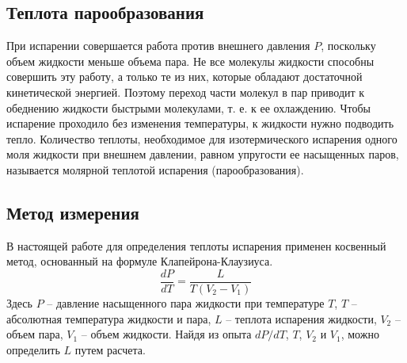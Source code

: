 \documentclass[a4paper,12pt]{article}
\theoremstyle{plain} %
\theoremstyle{definition} %
\theoremstyle{remark} %
\begin{document}
	\subsection{Теплота парообразования}
	При испарении совершается работа против внешнего давления $P$, поскольку объем жидкости меньше объема пара. Не все молекулы жидкости способны совершить эту работу, а только те из них, которые обладают достаточной кинетической энергией. Поэтому переход части молекул в пар приводит к обеднению жидкости быстрыми молекулами, т. е. к ее охлаждению. Чтобы испарение проходило без изменения температуры, к жидкости нужно подводить тепло. Количество теплоты, необходимое для изотермического испарения одного моля жидкости при внешнем давлении, равном упругости ее насыщенных паров, называется молярной теплотой испарения (парообразования).
	\subsection{Метод измерения}
	В настоящей работе для определения теплоты испарения применен косвенный метод, основанный на формуле Клапейрона-Клаузиуса.
	\begin{equation}
	\frac{dP}{dT} = \frac{L}{T(V_2-V_1)}
	\end{equation}
	Здесь $P$ -- давление насыщенного пара жидкости при температуре $T$, $T$ -- абсолютная температура жидкости и пара, $L$ -- теплота испарения жидкости, $V_2$ -- объем пара, $V_1$ -- объем жидкости. Найдя из опыта $dP/dT$, $T$, $V_2$ и $V_1$, можно определить $L$ путем расчета.
\end{document}
